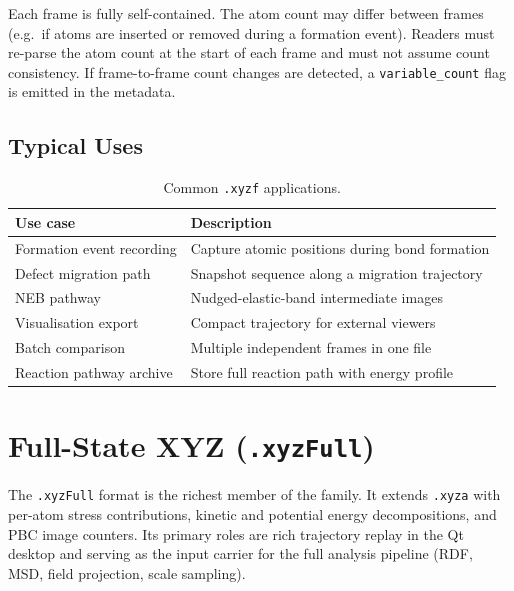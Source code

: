\documentclass[11pt, a4paper, oneside]{article}
\begin{document}
Each frame is fully self-contained. The atom count may differ between frames
(e.g.\ if atoms are inserted or removed during a formation event). Readers
must re-parse the atom count at the start of each frame and must not assume
count consistency. If frame-to-frame count changes are detected, a
\texttt{variable\_count} flag is emitted in the metadata.

\subsection{Typical Uses}
\label{sec:xyzf_uses}

\begin{table}[h]
\centering
\begin{tabular}{ll}
  \toprule
  Use case & Description \\
  \midrule
  Formation event recording & Capture atomic positions during bond formation \\
  Defect migration path     & Snapshot sequence along a migration trajectory \\
  NEB pathway               & Nudged-elastic-band intermediate images \\
  Visualisation export      & Compact trajectory for external viewers \\
  Batch comparison          & Multiple independent frames in one file \\
  Reaction pathway archive  & Store full reaction path with energy profile \\
  \bottomrule
\end{tabular}
\caption{Common \texttt{.xyzf} applications.}
\label{tab:xyzf_uses}
\end{table}

\section{Full-State XYZ (\texttt{.xyzFull})}
\label{sec:xyzFull}

The \texttt{.xyzFull} format is the richest member of the family. It extends
\texttt{.xyza} with per-atom stress contributions, kinetic and potential
energy decompositions, and PBC image counters. Its primary roles are rich
trajectory replay in the Qt desktop and serving as the input carrier for the
full analysis pipeline (RDF, MSD, field projection, scale sampling).
\end{document}
